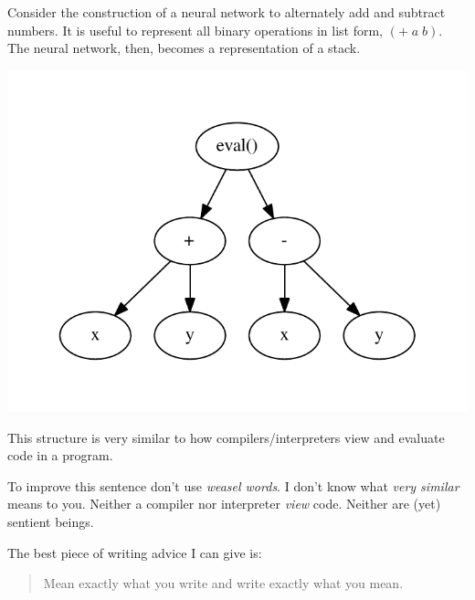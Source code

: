 \documentclass[./Research.tex]{subfiles}
\begin{document}
 Consider the construction of a neural network to alternately add and subtract numbers. It is useful to represent all binary operations in list form, $\left(+\;a\;b\right)$. The neural network, then, becomes a representation of a stack. 


\def\layersep{2.5cm}

\vspace{2em}
{\centering
{}
}


\includegraphics{Visuals/NeuralNetwork_1_SyntaxTree.pdf}

This structure is very similar to how compilers/interpreters view and evaluate code in a program.

{\color{red}
   To improve this sentence don't use \emph{weasel words}. I don't know what \emph{very similar} means to you. Neither a compiler nor interpreter \emph{view} code. Neither are (yet) sentient beings. 
   
   The best piece of writing advice I can give is: 
   \begin{quote}
       Mean exactly what you write and write exactly what you mean. 
   \end{quote}
}
\end{document}
